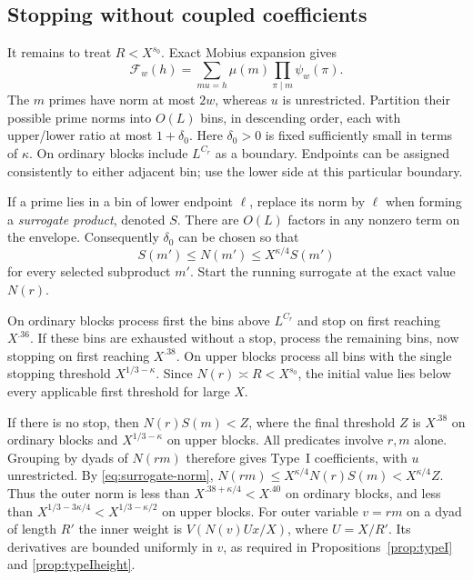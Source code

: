 \subsection{Stopping without coupled coefficients}

It remains to treat $R<X^{s_0}$.  Exact Mobius expansion gives
\begin{equation}\label{eq:rough-mobius-expansion}
 \mathcal F_w(h)=
 \sum_{mu=h}\mu(m)\prod_{\pi\mid m}\psi_w(\pi).
\end{equation}
The $m$ primes have norm at most $2w$, whereas $u$ is unrestricted.
Partition their possible prime norms into $O(L)$ bins, in descending
order, each with upper/lower ratio at most $1+\delta_0$.  Here
$\delta_0>0$ is fixed sufficiently small in terms of $\kappa$.
On ordinary blocks include $L^{C_r}$ as a boundary.  Endpoints can
be assigned consistently to either adjacent bin; use the lower side
at this particular boundary.

If a prime lies in a bin of lower endpoint $\ell$, replace its norm
by $\ell$ when forming a \emph{surrogate product}, denoted $S$.
There are $O(L)$ factors in any nonzero term on the envelope.
Consequently $\delta_0$ can be chosen so that
\begin{equation}\label{eq:surrogate-norm}
 S(m')\le N(m')\le X^{\kappa/4}S(m')
\end{equation}
for every selected subproduct $m'$.
Start the running surrogate at the exact value $N(r)$.

On ordinary blocks process first the bins above $L^{C_r}$ and stop
on first reaching $X^{.36}$.  If these bins are exhausted without
a stop, process the remaining bins, now stopping on first reaching
$X^{.38}$.  On upper blocks process all bins with the single stopping
threshold $X^{1/3-\kappa}$.  Since $N(r)\asymp R<X^{s_0}$, the
initial value lies below every applicable first threshold for large $X$.

If there is no stop, then $N(r)S(m)<Z$, where the final threshold
$Z$ is $X^{.38}$ on ordinary blocks and $X^{1/3-\kappa}$ on upper
blocks.  All predicates involve $r,m$ alone.  Grouping
by dyads of $N(rm)$ therefore gives Type~I coefficients, with $u$
unrestricted.  By \eqref{eq:surrogate-norm},
$N(rm)\le X^{\kappa/4}N(r)S(m)<X^{\kappa/4}Z$.
Thus the outer norm is less
than $X^{.38+\kappa/4}<X^{.40}$ on ordinary blocks, and less than
$X^{1/3-3\kappa/4}<X^{1/3-\kappa/2}$ on upper blocks.
For outer variable $v=rm$ on a dyad of length $R'$ the inner weight is
$V(N(v)U x/X)$, where $U=X/R'$.  Its derivatives are bounded uniformly
in $v$, as required in Propositions~\ref{prop:typeI} and
\ref{prop:typeIheight}.

